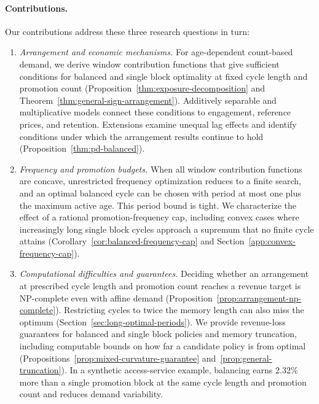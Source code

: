 \paragraph{Contributions.} \begingroup\color{black}
Our contributions address these three research questions in turn:
\begin{enumerate}[leftmargin=1.5em]
\item \emph{Arrangement and economic mechanisms.} For age-dependent count-based demand, we derive window contribution functions that give sufficient conditions for balanced and single block optimality at fixed cycle length and promotion count (Proposition~\ref{thm:exposure-decomposition} and Theorem~\ref{thm:general-sign-arrangement}). Additively separable and multiplicative models connect these conditions to engagement, reference prices, and retention. Extensions examine unequal lag effects and identify conditions under which the arrangement results continue to hold (Proposition~\ref{thm:pd-balanced}).
\item \emph{Frequency and promotion budgets.} When all window contribution functions are concave, unrestricted frequency optimization reduces to a finite search, and an optimal balanced cycle can be chosen with period at most one plus the maximum active age. This period bound is tight. We characterize the effect of a rational promotion-frequency cap, including convex cases where increasingly long single block cycles approach a supremum that no finite cycle attains (Corollary~\ref{cor:balanced-frequency-cap} and Section~\ref{app:convex-frequency-cap}).
\item \emph{Computational difficulties and guarantees.} Deciding whether an arrangement at prescribed cycle length and promotion count reaches a revenue target is NP-complete even with affine demand (Proposition~\ref{prop:arrangement-np-complete}). Restricting cycles to twice the memory length can also miss the optimum (Section~\ref{sec:long-optimal-periods}). We provide revenue-loss guarantees for balanced and single block policies and memory truncation, including computable bounds on how far a candidate policy is from optimal (Propositions~\ref{prop:mixed-curvature-guarantee} and~\ref{prop:general-truncation}). In a synthetic access-service example, balancing earns 2.32\% more than a single promotion block at the same cycle length and promotion count and reduces demand variability.
\end{enumerate}
\par\endgroup

